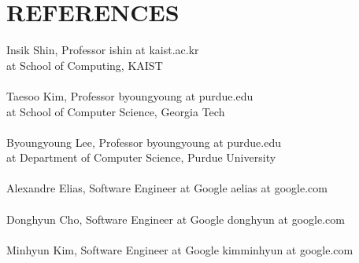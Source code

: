 \section{REFERENCES}
   \vspace{0.1in}

    Insik Shin, Professor
    \hfill ishin at kaist.ac.kr\\
    at School of Computing, KAIST\\
    \\
%
    Taesoo Kim, Professor
    \hfill byoungyoung at purdue.edu\\
    at School of Computer Science, Georgia Tech\\
    \\
%
    Byoungyoung Lee, Professor
    \hfill byoungyoung at purdue.edu\\
    at Department of Computer Science, Purdue University\\
    \\
%
    Alexandre Elias, Software Engineer at Google
    \hfill aelias at google.com\\
    \\
%
    Donghyun Cho, Software Engineer at Google
    \hfill donghyun at google.com\\
    \\
%
    Minhyun Kim, Software Engineer at Google
    \hfill kimminhyun at google.com
